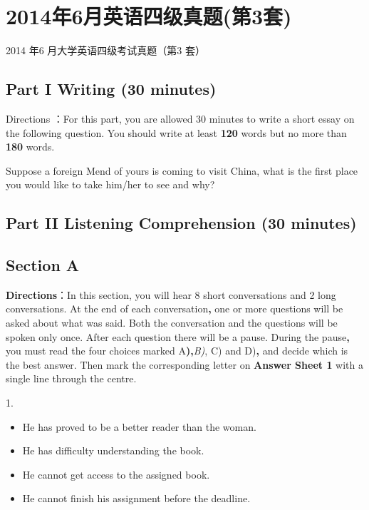 \documentclass[UTF8,11pt]{ctexart}
\begin{document}
\section*{2014年6月英语四级真题(第3套)}
2014 年6 月大学英语四级考试真题（第3 套）


\subsection*{\textbf{Part I} \textbf{Writing} \textbf{(30 minutes)}}


Directions ：For this part, you are allowed 30 minutes to write a short essay on the following question. You should write at least \textbf{120} words but no more than \textbf{180} words.


Suppose a foreign Mend of yours is coming to visit China, what is the first place you would like to take him/her to see and why?


\subsection*{\textbf{Part II} \textbf{Listening Comprehension} \textbf{(30 minutes)}}


\subsection*{Section A}


\textbf{Directions}：In this section, you will hear 8 short conversations and 2 long conversations. At the end of each conversation\textbf{,} one or more questions will be asked about what was said. Both the conversation and the questions will be spoken only once. After each question there will be a pause. During the pause\textbf{,} you must read the four choices marked A\textbf{),}\textit{B)}, C) and D)\textbf{,} and decide which is the best answer. Then mark the corresponding letter on \textbf{Answer Sheet 1} with a single line through the centre.


1.


\begin{itemize}[leftmargin=2em,itemsep=.2em,topsep=.4em]\item[A.] He has proved to be a better reader than the woman.
\item[B.] He has difficulty understanding the book.
\item[C.] He cannot get access to the assigned book.
\item[D.] He cannot finish his assignment before the deadline.
\end{itemize}
\end{document}
